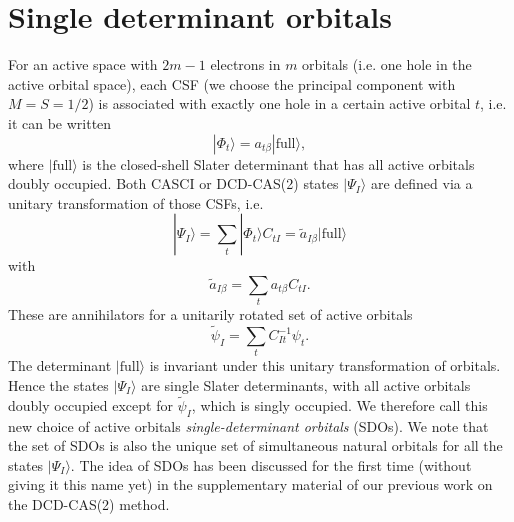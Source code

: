 \section{Single determinant orbitals}
\label{Ap:SDOs}
For an active space with $2m - 1$ electrons in $m$ orbitals (i.e. one hole in the active orbital space), each CSF (we choose the principal component with $M = S = 1/2$) is associated with exactly one hole in a certain active orbital $t$, i.e. it can be written
	\begin{equation}
	|{\Phi _t}\rangle  = {a_{t\beta }}|{\text{full}}\rangle, 
	\end{equation} 	
where $|{\text{full}}\rangle $ is the closed-shell Slater determinant that has all active orbitals doubly occupied. Both CASCI or DCD-CAS(2) states $|{\Psi _I}\rangle $ are defined via a unitary transformation of those CSFs, i.e.
	\begin{equation}
	|{\Psi _I}\rangle  = \sum\limits_t | {\Phi _t}\rangle {C_{tI}} = {\tilde a_{I\beta }}|{\text{full}}\rangle 
	\end{equation} 	
with
	\begin{equation}
	{\tilde a_{I\beta }} = \sum\limits_t {{a_{t\beta }}} {C_{tI}}.
	\end{equation} 	
These are annihilators for a unitarily rotated set of active orbitals
	\begin{equation}
	{\tilde \psi _I} = \sum\limits_t {C_{It}^{ - 1}} {\psi _t}.
	\end{equation} 	
The determinant $|{\text{full}}\rangle $ is invariant under this unitary transformation of orbitals. Hence the states $|{\Psi _I}\rangle $ are single Slater determinants, with all active orbitals doubly occupied except for ${\tilde \psi _I}$, which is singly occupied. We therefore call this new choice of active orbitals \emph{single-determinant orbitals} (SDOs). We note that the set of SDOs is also the unique set of simultaneous natural orbitals for all the states $|{\Psi _I}\rangle $. The idea of SDOs has been discussed for the first time (without giving it this name yet) in the supplementary material of our previous work on the DCD-CAS(2) method.\cite{PathaLN_2017_234109}

